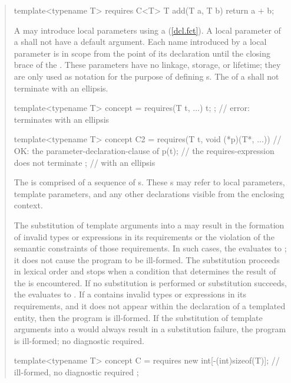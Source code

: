 \begin{quote}
\begin{addedblock}
\begin{codeblock}
template<typename T> requires C<T> 
  T add(T a, T b) { return a + b; }
\end{codeblock}
\exitnote

\pnum
A  may introduce local parameters using a
(\ref{dcl.fct}). 
%
A local parameter of a  shall not have a 
default argument.
%
Each name introduced by a local parameter is in scope from the point
of its declaration until the closing brace of the
.
%
These parameters have no linkage, storage, or lifetime; they are only used
as notation for the purpose of defining s.
%
The  of a 
 shall
not terminate with an ellipsis.
\enterexample
\begin{codeblock}
template<typename T>
  concept = requires(T t, ...) { 
    t; 
  }; // error: terminates with an ellipsis

template<typename T>
  concept C2 = 
    requires(T t, void (*p)(T*, ...)) { // OK: the parameter-declaration-clause of
    p(t);                               // the requires-expression does not terminate 
  };                                    // with an ellipsis
\end{codeblock}
\exitexample

\pnum
The  is comprised of 
a sequence of s.
%
These s may refer to local 
parameters, template parameters, and any other declarations visible from the 
enclosing context. 

\pnum
The substitution of template arguments into a  
may result in the formation of invalid types or expressions in its
requirements or the violation of the semantic constraints of those requirements.
In such cases, the  evaluates to ;
it does not cause the program to be ill-formed.
The substitution proceeds in lexical order and stops when a condition that
determines the result of the  is encountered.
If no substitution is performed or substitution succeeds,
the  evaluates to .
\enternote
If a  contains invalid types or expressions in
its requirements, and it does not appear within the declaration of a templated
entity, then the program is ill-formed.
\exitnote
If the substitution of template arguments into a  
would always result in a substitution failure, the program is ill-formed; 
no diagnostic required.
%
\enterexample
\begin{codeblock}
template<typename T> concept C =
  requires {
    new int[-(int)sizeof(T)]; // ill-formed, no diagnostic required
  };
\end{codeblock}
\exitexample



\end{addedblock}
\end{quote}
